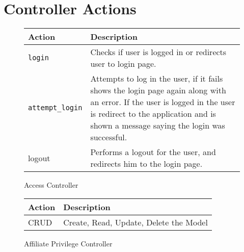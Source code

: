 \chapter{Controller Actions}
\label{app:controller_actions}

\begin{figure}[htb]
\begin{center}
\begin{tabular}{ | l | p{8cm} | }
  \hline
    \textbf{Action} & \textbf{Description} \\ \hline
    \verb+login+ & Checks if user is logged in or redirects user to login page. \\ \hline
    \verb+attempt_login+ & Attempts to log in the user, if it fails shows the login page again along with an error. If the user is logged in the user is redirect to the application and is shown a message saying the login was successful. \\ \hline
    logout & Performs a logout for the user, and redirects him to the login page. \\ \hline
\end{tabular}
\caption{Access Controller}
\label{tab:access_controller_actions}
\end{center}
\end{figure}

\begin{figure}[htb]
\begin{center}
\begin{tabular}{ | l | p{8cm} | }
  \hline
    \textbf{Action} & \textbf{Description} \\ \hline
    CRUD & Create, Read, Update, Delete the Model \\ \hline
\end{tabular}
\caption{Affiliate Privilege Controller}
\label{tab:affpriv_controller_actions}
\end{center}
\end{figure}

